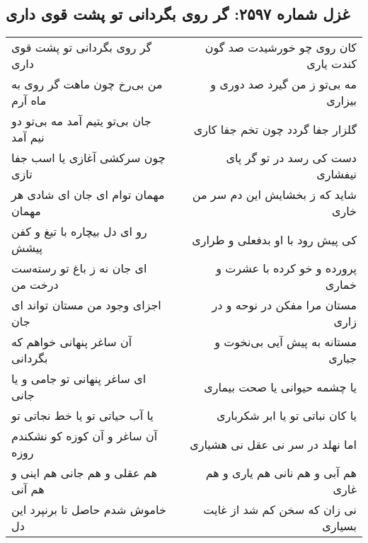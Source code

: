 \begin{center}
\section*{غزل شماره ۲۵۹۷: گر روی بگردانی تو پشت قوی داری}
\label{sec:2597}
\begin{longtable}{l p{0.5cm} r}
گر روی بگردانی تو پشت قوی داری
&&
کان روی چو خورشیدت صد گون کندت یاری
\\
من بی‌رخ چون ماهت گر روی به ماه آرم
&&
مه بی‌تو ز من گیرد صد دوری و بیزاری
\\
جان بی‌تو یتیم آمد مه بی‌تو دو نیم آمد
&&
گلزار جفا گردد چون تخم جفا کاری
\\
چون سرکشی آغازی یا اسب جفا تازی
&&
دست کی رسد در تو گر پای نیفشاری
\\
مهمان توام ای جان ای شادی هر مهمان
&&
شاید که ز بخشایش این دم سر من خاری
\\
رو ای دل بیچاره با تیغ و کفن پیشش
&&
کی پیش رود با او بدفعلی و طراری
\\
ای جان نه ز باغ تو رسته‌ست درخت من
&&
پرورده و خو کرده با عشرت و خماری
\\
اجزای وجود من مستان تواند ای جان
&&
مستان مرا مفکن در نوحه و در زاری
\\
آن ساغر پنهانی خواهم که بگردانی
&&
مستانه به پیش آیی بی‌نخوت و جباری
\\
ای ساغر پنهانی تو جامی و یا جانی
&&
یا چشمه حیوانی یا صحت بیماری
\\
یا آب حیاتی تو یا خط نجاتی تو
&&
یا کان نباتی تو یا ابر شکرباری
\\
آن ساغر و آن کوزه کو نشکندم روزه
&&
اما نهلد در سر نی عقل نی هشیاری
\\
هم عقلی و هم جانی هم اینی و هم آنی
&&
هم آبی و هم نانی هم یاری و هم غاری
\\
خاموش شدم حاصل تا برنپرد این دل
&&
نی زان که سخن کم شد از غایت بسیاری
\\
\end{longtable}
\end{center}

